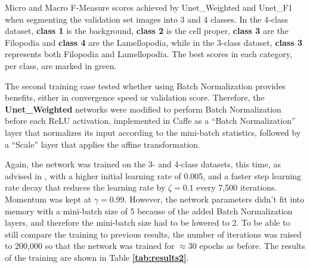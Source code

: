 \begin {table}
\caption[]{Micro and Macro F-Measure scores achieved by Unet\_Weighted and Unet\_F1 when segmenting the validation set images into 3 and 4 classes. In the 4-class dataset, \textbf{class 1} is the background, \textbf{class 2} is the cell proper, \textbf{class 3} are the Filopodia and \textbf{class 4} are the Lamellopodia, while in the 3-class dataset, \textbf{class 3} represents both Filopodia and Lamellopodia. The best scores in each category, per class, are marked in green.}
\label{tab:results1}
\end {table}

\noindent The second training case tested whether using Batch Normalization provides benefits, either in convergence speed or validation score. Therefore, the \textbf{Unet\_Weighted} networks were modified to perform Batch Normalization before each ReLU activation, implemented in Caffe as a ``Batch Normalization'' layer that normalizes its input according to the mini-batch statistics, followed by a ``Scale'' layer that applies the affine transformation.

Again, the network was trained on the 3- and 4-class datasets, this time, as advised in \cite{batchnorm}, with a higher initial learning rate of 0.005, and a faster step learning rate decay that reduces the learning rate by $\zeta = 0.1$ every 7,500 iterations. Momentum was kept at $\gamma = 0.99$. However, the network parameters didn't fit into memory with a mini-batch size of 5 because of the added Batch Normalization layers, and therefore the mini-batch size had to be lowered to 2. To be able to still compare the training to previous results, the number of iterations was raised to 200,000 so that the network was trained for $\approx$30 epochs as before. The results of the training are shown in Table \textbf{\ref{tab:results2}}.


